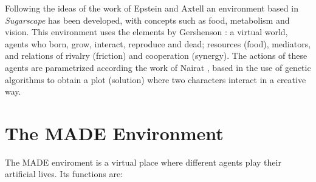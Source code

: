 \documentclass[runningheads]{llncs}
\begin{document}

Following the ideas of the work of Epstein and Axtell
\cite{epstein1996growing} an environment based in {\em Sugarscape} has
been developed, with concepts such as food, metabolism and
vision. This environment uses the elements by Gershenson %
\cite{gershenson2005general}: a virtual world, agents who born, grow,
interact, reproduce and dead; resources (food), mediators, and
relations of rivalry (friction) and cooperation (synergy). The actions
of these agents are parametrized according the work of Nairat
\cite{nairat2011character}, based in the use of genetic algorithms to
obtain a plot (solution) where two characters interact in a creative way.
 






\section{The MADE Environment}
\label{sec:made}

The MADE enviroment is a virtual place where different agents play their artificial lives. Its functions are:
\end{document}

